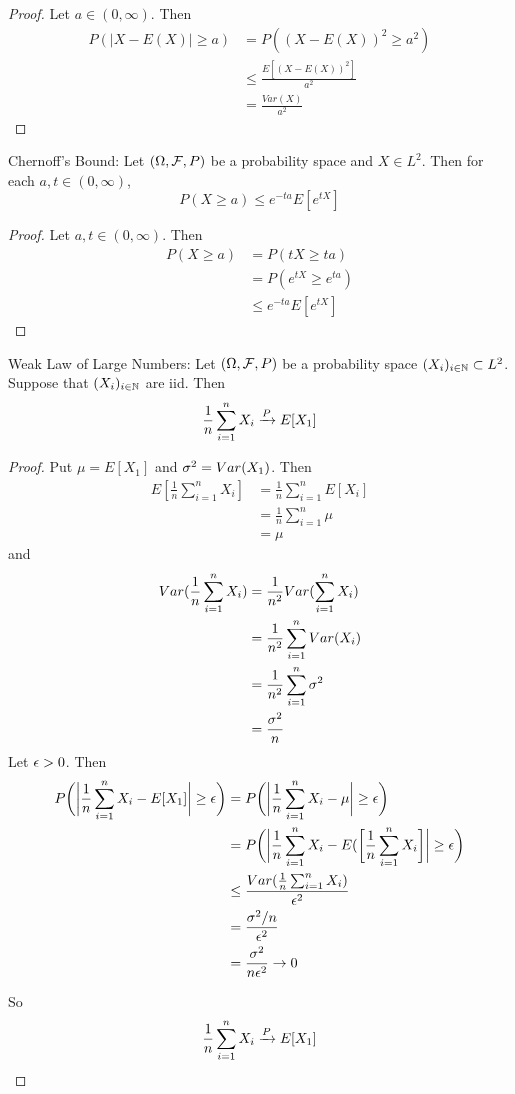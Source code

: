 \documentclass{book}
\begin{document}
	\begin{proof}
		Let $a \in (0, \infty)$. Then 
		\begin{align*}
			P(| X - E(X) | \geq a) 
			&= P((X - E(X))^2 \geq a^2) \\
			&\leq \frac{E[(X - E(X))^2]}{a^2} \\
			&= \frac{Var(X)}{a^2}  
		\end{align*}
	\end{proof}
	
	\begin{ex}{Chernoff's Bound:}
		Let $(\Omega, \mathcal{F}, P)$ be a probability space and $X \in L^2$. Then for each $a, t \in (0, \infty)$, $$P( X \geq a) \leq e^{-ta}E[e^{tX}]$$
	\end{ex}
	
	\begin{proof}
		Let $a, t \in (0, \infty)$. Then 
		\begin{align*}
			P( X \geq a)
			&= P(tX \geq ta) \\
			&= P(e^{tX} \geq e^{ta}) \\
			& \leq e^{-ta}E[e^{tX}]
		\end{align*}
	\end{proof}
	
	\begin{ex}{Weak Law of Large Numbers:}
		Let $(\Omega, \mathcal{F}, P)$ be a probability space $(X_i)_{i\in \mathbb{N}} \subset L^2$. Suppose that $(X_i)_{i\in \mathbb{N}}$ are iid. Then $$\frac{1}{n}\sum_{i=1}^n X_i \xrightarrow{P} E[X_1]$$
	\end{ex}
	
	\begin{proof}
		Put $\mu = E[X_1]$ and $\sigma^2 = Var(X_1)$. Then 
		\begin{align*}
			E[\frac{1}{n}\sum_{i=1}^n X_i] 
			&= \frac{1}{n} \sum_{i=1}^nE[X_i] \\
			&= \frac{1}{n} \sum_{i=1}^n \mu \\
			&= \mu
		\end{align*} and 
		\begin{align*}
			Var(\frac{1}{n}\sum_{i=1}^n X_i) 
			&= \frac{1}{n^2} Var(\sum_{i=1}^n X_i) \\
			&= \frac{1}{n^2} \sum_{i=1}^n Var(X_i) \\
			&= \frac{1}{n^2} \sum_{i=1}^n \sigma^2 \\
			&= \frac{\sigma^2}{n}
		\end{align*}
		Let $\epsilon >0$. Then 
		\begin{align*}
			P\bigg(\bigg | \frac{1}{n} \sum_{i=1}^n X_i - E[X_1] \bigg | \geq \epsilon \bigg) 
			& = P\bigg(\bigg| \frac{1}{n} \sum_{i=1}^n X_i - \mu \bigg| \geq \epsilon\bigg) \\
			& = P\bigg(\bigg| \frac{1}{n} \sum_{i=1}^n X_i - E(\bigg[\frac{1}{n}\sum_{i=1}^n X_i \bigg] \bigg| \geq \epsilon\bigg) \\ 
			&\leq \frac{Var(\frac{1}{n} \sum_{i=1}^n X_i)}{\epsilon^2} \\
			& =  \frac{\sigma^2 / n}{\epsilon^2} \\
			&= \frac{\sigma^2}{n\epsilon^2} \rightarrow 0
		\end{align*}
		
		So $$\frac{1}{n}\sum_{i=1}^n X_i \xrightarrow{P} E[X_1]$$
	\end{proof}
	
\end{document}
